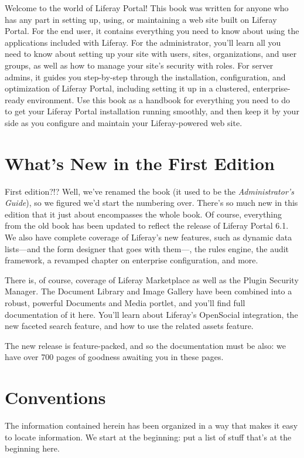 \documentclass[9pt,openright,twoside]{memoir}
\begin{document}
Welcome to the world of Liferay Portal! This book was written for anyone who has
any part in setting up, using, or maintaining a web site built on Liferay
Portal. For the end user, it contains everything you need to know about using
the applications included with Liferay. For the administrator, you'll learn all
you need to know about setting up your site with users, sites, organizations,
and user groups, as well as how to manage your site's security with roles. For
server admins, it guides you step-by-step through the installation,
configuration, and optimization of Liferay Portal, including setting it up in a
clustered, enterprise-ready environment. Use this book as a handbook for
everything you need to do to get your Liferay Portal installation running
smoothly, and then keep it by your side as you configure and maintain your
Liferay-powered web site.

\section{What's New in the First Edition}

First edition?!? Well, we've renamed the book (it used to be the
\emph{Administrator's Guide}), so we figured we'd start the numbering over.
There's so much new in this edition that it just about encompasses the whole
book. Of course, everything from the old book has been updated to reflect
the release of Liferay Portal 6.1. We also have complete coverage of Liferay's
new features, such as dynamic data lists---and the form designer that goes with
them---, the rules engine, the audit framework, a revamped chapter on enterprise
configuration, and more. 

There is, of course, coverage of Liferay Marketplace as well as the Plugin
Security Manager. The Document Library and Image Gallery have been combined into
a robust, powerful Documents and Media portlet, and you'll find full
documentation of it here. You'll learn about Liferay's OpenSocial integration,
the new faceted search feature, and how to use the related assets feature. 

The new release is feature-packed, and so the documentation must be also: we
have over 700 pages of goodness awaiting you in these pages. 

\section{Conventions}

The information contained herein has been organized in a way that makes it easy
to locate information. We start at the beginning: put a list of stuff that's at
the beginning here. 
\end{document}

